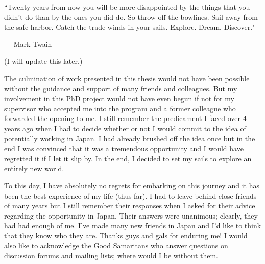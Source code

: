 \epigraph{``Twenty years from now you will be more disappointed by the things that you didn't do than by the ones you did do. So throw off the bowlines. Sail away from the safe harbor. Catch the trade winds in your sails. Explore. Dream. Discover."}{--- \textup{Mark Twain}}

(I will update this later.)

The culmination of work presented in this thesis would not have been possible without the guidance and support of many friends and colleagues. But my involvement in this PhD project would not have even begun if not for my supervisor who accepted me into the program and a former colleague who forwarded the opening to me. I still remember the predicament I faced over 4 years ago when I had to decide whether or not I would commit to the idea of potentially working in Japan. I had already brushed off the idea once but in the end I was convinced that it was a tremendous opportunity and I would have regretted it if I let it slip by. In the end, I decided to set my sails to explore an entirely new world.

To this day, I have absolutely no regrets for embarking on this journey and it has been the best experience of my life (thus far). I had to leave behind close friends of many years but I still remember their responses when I asked for their advice regarding the opportunity in Japan. Their answers were unanimous; clearly, they had had enough of me. I've made many new friends in Japan and I'd like to think that they know who they are. Thanks guys and gals for enduring me! I would also like to acknowledge the Good Samaritans who answer questions on discussion forums and mailing lists; where would I be without them.
